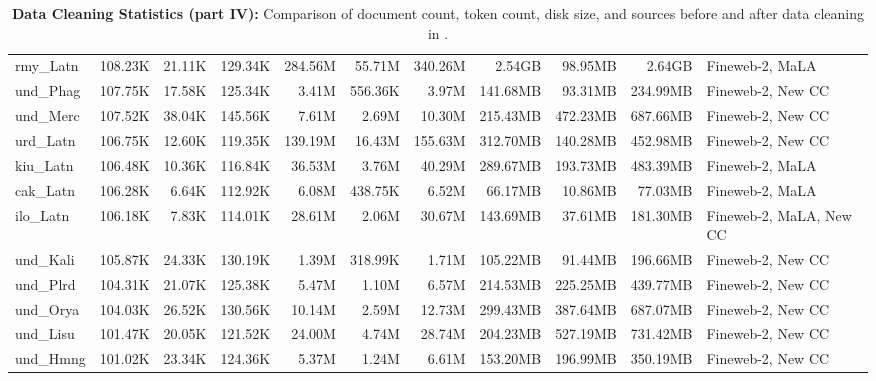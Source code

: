 \begin{table*}[!htp]
{\begin{tabular}{l|rrr|rrr|rrr|l}
rmy\_Latn                   & 108.23K    & 21.11K       & 129.34K     & 284.56M      & 55.71M         & 340.26M       & 2.54GB     & 98.95MB      & 2.64GB      & Fineweb-2, MaLA         \\
und\_Phag                   & 107.75K    & 17.58K       & 125.34K     & 3.41M        & 556.36K        & 3.97M         & 141.68MB   & 93.31MB      & 234.99MB    & Fineweb-2, New CC       \\
und\_Merc                   & 107.52K    & 38.04K       & 145.56K     & 7.61M        & 2.69M          & 10.30M        & 215.43MB   & 472.23MB     & 687.66MB    & Fineweb-2, New CC       \\
urd\_Latn                   & 106.75K    & 12.60K       & 119.35K     & 139.19M      & 16.43M         & 155.63M       & 312.70MB   & 140.28MB     & 452.98MB    & Fineweb-2, New CC       \\
kiu\_Latn                   & 106.48K    & 10.36K       & 116.84K     & 36.53M       & 3.76M          & 40.29M        & 289.67MB   & 193.73MB     & 483.39MB    & Fineweb-2, MaLA         \\
cak\_Latn                   & 106.28K    & 6.64K        & 112.92K     & 6.08M        & 438.75K        & 6.52M         & 66.17MB    & 10.86MB      & 77.03MB     & Fineweb-2, MaLA         \\
ilo\_Latn                   & 106.18K    & 7.83K        & 114.01K     & 28.61M       & 2.06M          & 30.67M        & 143.69MB   & 37.61MB      & 181.30MB    & Fineweb-2, MaLA, New CC \\
und\_Kali                   & 105.87K    & 24.33K       & 130.19K     & 1.39M        & 318.99K        & 1.71M         & 105.22MB   & 91.44MB      & 196.66MB    & Fineweb-2, New CC       \\
und\_Plrd                   & 104.31K    & 21.07K       & 125.38K     & 5.47M        & 1.10M          & 6.57M         & 214.53MB   & 225.25MB     & 439.77MB    & Fineweb-2, New CC       \\
und\_Orya                   & 104.03K    & 26.52K       & 130.56K     & 10.14M       & 2.59M          & 12.73M        & 299.43MB   & 387.64MB     & 687.07MB    & Fineweb-2, New CC       \\
und\_Lisu                   & 101.47K    & 20.05K       & 121.52K     & 24.00M       & 4.74M          & 28.74M        & 204.23MB   & 527.19MB     & 731.42MB    & Fineweb-2, New CC       \\
und\_Hmng                   & 101.02K    & 23.34K       & 124.36K     & 5.37M        & 1.24M          & 6.61M         & 153.20MB   & 196.99MB     & 350.19MB    & Fineweb-2, New CC      \\
\bottomrule
\end{tabular}}
\caption{
\label{tab_app:data_clean_4}
\textbf{Data Cleaning Statistics (part IV):} Comparison of document count, token count, disk size, and sources before and after data cleaning  in \dcad.
}
\end{table*}